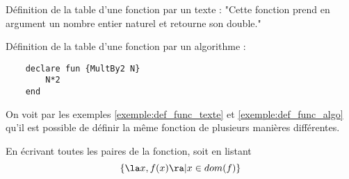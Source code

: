 \begin{myexem}\label{exemple:def_func_texte}
  Définition de la table d'une fonction par un texte : "Cette fonction prend en argument un nombre entier naturel et retourne son double."
\end{myexem}

\begin{myexem}\label{exemple:def_func_algo}
  Définition de la table d'une fonction par un algorithme : 
  \begin{lstlisting}
    declare fun {MultBy2 N}
        N*2
    end
  \end{lstlisting}
  On voit par les exemples \ref{exemple:def_func_texte} et \ref{exemple:def_func_algo} qu'il est possible de définir la même fonction de plusieurs manières différentes.
\end{myexem}
\begin{myexem}
  En écrivant toutes les paires de la fonction, soit en listant $$ \{ \la x, f(x) \ra | x \in dom(f)\}$$
\end{myexem}

